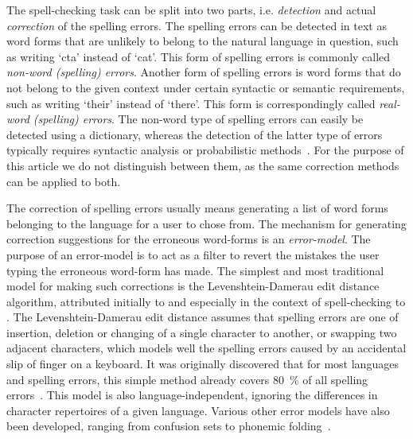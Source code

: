 \documentclass{llncs}
\begin{document}
The spell-checking task can be split into two parts, i.e. \emph{detection} and
actual \emph{correction} of the spelling errors. The spelling errors can be
detected in text as word forms that are unlikely to belong to the
natural language in question, such as writing `cta' instead of `cat'. This form
of spelling errors is commonly called \emph{non-word (spelling) errors}.
Another form of spelling errors is word forms that do not belong to the given
context under certain syntactic or semantic requirements, such as writing
`their' instead of `there'. This form is correspondingly called \emph{real-word
(spelling) errors}. The non-word type of spelling errors can easily be detected
using a dictionary, whereas the detection of the latter type of errors typically
requires syntactic analysis or probabilistic methods~\cite{mitton/2009}. For
the purpose of this article we do not distinguish between them, as the same
correction methods can be applied to both.

The correction of spelling errors usually means generating a list of word forms
belonging to the language for a user to chose from. The mechanism for
generating correction suggestions for the erroneous word-forms is an
\emph{error-model}. The purpose of an error-model is to act as a filter to
revert the mistakes the user typing the erroneous word-form has made.  The
simplest and most traditional model for making such corrections is the
Levenshtein-Damerau edit distance algorithm, attributed initially to
\cite{levenshtein/1966} and especially in the context of spell-checking to
\cite{damerau/1964}. The Levenshtein-Damerau edit distance assumes that
spelling errors are one of insertion, deletion or changing of a single
character to another, or swapping two adjacent characters, which models well
the spelling errors caused by an accidental slip of finger on a keyboard. It
was originally discovered that for most languages and spelling errors, this
simple method already covers 80~\% of all spelling errors~\cite{damerau/1964}.
This model is also language-independent, ignoring the differences in character
repertoires of a given language. Various other error models have also been
developed, ranging from confusion sets to phonemic folding~\cite{kukich/1992}.
\end{document}
